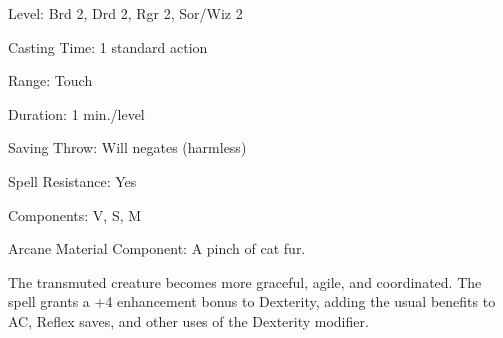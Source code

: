 
\begin{description*}
\item[Level:] Brd 2, Drd 2, Rgr 2, Sor/Wiz 2
\item[Casting Time:] 1 standard action
\item[Range:] Touch
\item[Duration:] 1 min./level
\item[Saving Throw:] Will negates (harmless)
\item[Spell Resistance:] Yes
\item[Components:] V, S, M
\item[Arcane Material Component:] A pinch of cat fur.
\end{description*}

The transmuted creature becomes more graceful, agile, and coordinated. The spell
grants a +4 enhancement bonus to Dexterity, adding the usual benefits to AC, Reflex
saves, and other uses of the Dexterity modifier.